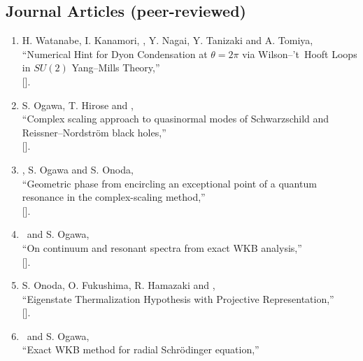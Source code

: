 \renewcommand{\labelenumi}{[\arabic{enumi}]}
\newcommand{\ITEM}[1]{%
 \renewcommand{\labelenumi}{$*$[\arabic{enumi}]}
 \item #1
 \renewcommand{\labelenumi}{[\arabic{enumi}]}
}
\subsection{Journal Articles (peer-reviewed)}
\begin{enumerate}
 \item H. Watanabe, I. Kanamori, \OM, Y. Nagai, Y. Tanizaki and A. Tomiya,\\
       ``Numerical Hint for Dyon Condensation at $\theta=2\pi$ via Wilson--'t~Hooft Loops in $SU(2)$ Yang--Mills Theory,''\\
       [].
 \item S. Ogawa, T. Hirose and \OM,\\
       ``Complex scaling approach to quasinormal modes of Schwarzschild and Reissner--Nordstr\"om black holes,''\\
       [].
 \item \OM, S. Ogawa and S. Onoda,\\
       ``Geometric phase from encircling an exceptional point of a quantum resonance in the complex-scaling method,''\\
       [].
 \item \OM\ and S. Ogawa,\\
       ``On continuum and resonant spectra from exact WKB analysis,''\\
       [].
 \item S. Onoda, O. Fukushima, R. Hamazaki and \OM,\\
       ``Eigenstate Thermalization Hypothesis with Projective Representation,''\\
       [].
 \item \OM\ and S. Ogawa,\\
       ``Exact WKB method for radial Schr\"odinger equation,''\\

\end{enumerate}
